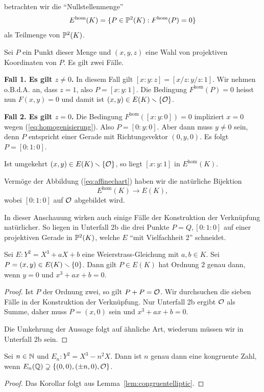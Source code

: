 betrachten wir die ``Nullstellenmenge''
\begin{equation*}
  E^{\mathrm{hom}}(K) = \{P \in {\mathbb{P}}^2(K): F^{\mathrm{hom}}(P) = 0\}
\end{equation*}
als Teilmenge von ${\mathbb{P}}^2(K)$.

Sei $P$ ein Punkt dieser Menge und $(x,y,z)$ eine Wahl von projektiven
Koordinaten von $P$. Es gilt zwei Fälle.

\textbf{Fall 1. Es gilt $z\not=0$.} In diesem Fall gilt $[x:y:z] =
[x/z:y/z:1]$. Wir nehmen o.B.d.A. an, dass $z=1$, also $P=[x:y:1]$.
Die Bedingung $F^{\mathrm{hom}}(P)=0$ heisst nun $F(x,y)=0$ und damit
ist $(x,y) \in E(K)\smallsetminus\{{\mathcal O}\}$.

\textbf{Fall 2. Es gilt $z=0$.} Die Bedingung
$F^{\mathrm{hom}}([x:y:0])=0$ impliziert
$x=0$ wegen (\ref{eq:homogenisierung}). Also $P = [0:y:0]$. Aber dann
muss $y\not=0$ sein, denn $P$ entspricht einer Gerade mit
Richtungsvektor $(0,y,0)$. Es folgt $P = [0:1:0]$.

Ist umgekehrt $(x,y)\in E(K)\smallsetminus\{{\mathcal O}\}$, so liegt $[x:y:1]$ in
$E^{\mathrm{hom}}(K)$.


Vermöge der Abbildung (\ref{eq:affinechart}) haben wir die natürliche
Bijektion 
\begin{equation*}
  E^{\mathrm{hom}}(K) \rightarrow E(K),
\end{equation*}
wobei $[0:1:0]$ auf ${\mathcal O}$ abgebildet wird. 

In dieser Anschauung wirken auch einige Fälle der Konstruktion der
Verknüpfung natürlicher. So liegen in  Unterfall 2b die drei Punkte
$P=Q,[0:1:0]$ auf einer projektiven Gerade in ${\mathbb{P}}^2(K)$, welche $E$
``mit Vielfachheit 2'' schneidet. 


\begin{lemma}
  \label{lem:2torsion}
  Sei $E:Y^2 = X^3+aX+b$ eine Weierstrass-Gleichung mit $a,b\in K$.
  Sei $P=(x,y)\in E(K)\smallsetminus\{0\}$. Dann gilt
   $P\in E(K)$ hat Ordnung $2$ genau dann, wenn $y=0$ und $x^3+ax+b=0$.
\end{lemma}
\begin{proof}
  Ist $P$ der Ordnung zwei, so gilt $P+P={\mathcal O}$.
  Wir durchsuchen die sieben Fälle in der Konstruktion der
  Verknüpfung. Nur Unterfall 2b ergibt ${\mathcal O}$ als Summe, daher muss
  $P=(x,0)$ sein und $x^3+ax+b=0$.

  Die Umkehrung der Aussage folgt auf ähnliche Art, wiederum müssen
  wir in Unterfall 2b sein.
\end{proof}

\begin{korollar}
  \label{kor:congruentelliptic}
  Sei $n\in{\mathbb{N}}$ und $E_n : Y^2 = X^3-n^2 X$. Dann ist
  $n$ genau dann eine kongruente Zahl, wenn $E_n({\mathbb{Q}}) \supsetneq
  \{(0,0),(\pm n,0),{\mathcal O}\}$. 
\end{korollar}
\begin{proof}
  Das Korollar folgt aus Lemma~\ref{lem:congruentelliptic}. 
\end{proof}

